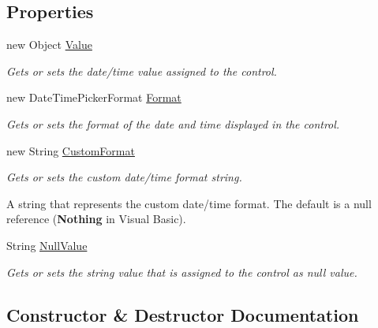 \subsection*{Properties}
\begin{DoxyCompactItemize}
\item 
new Object \hyperlink{class_custom_controls_1_1_nullable_date_time_picker_a10ca9af18d1ba8e6985257fcf374748b}{Value}
\begin{DoxyCompactList}\small\item\em Gets or sets the date/time value assigned to the control. \end{DoxyCompactList}\item 
new Date\+Time\+Picker\+Format \hyperlink{class_custom_controls_1_1_nullable_date_time_picker_a7e3ba070bcfbb12d9b954679652e9093}{Format}
\begin{DoxyCompactList}\small\item\em Gets or sets the format of the date and time displayed in the control. \end{DoxyCompactList}\item 
new String \hyperlink{class_custom_controls_1_1_nullable_date_time_picker_a1be4007c2054e1d58ee0c211aa2d4d12}{Custom\+Format}
\begin{DoxyCompactList}\small\item\em Gets or sets the custom date/time format string. 

A string that represents the custom date/time format. The default is a null reference ({\bfseries Nothing} in Visual Basic).\end{DoxyCompactList}\item 
String \hyperlink{class_custom_controls_1_1_nullable_date_time_picker_a9efcb8f7340f813306a8e2ca388e156e}{Null\+Value}
\begin{DoxyCompactList}\small\item\em Gets or sets the string value that is assigned to the control as null value. \end{DoxyCompactList}\end{DoxyCompactItemize}


\subsection{Constructor \& Destructor Documentation}
\mbox{\label{class_custom_controls_1_1_nullable_date_time_picker_ae34b0db983f9509c0442e730a8baa417}} 
